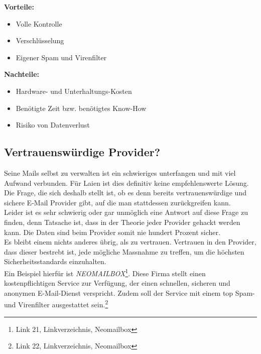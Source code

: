 \textbf{Vorteile:}
\begin{itemize}
    \item Volle Kontrolle
    \item Verschlüsselung
    \item Eigener Spam und Virenfilter
\end{itemize}

\textbf{Nachteile:}
\begin{itemize}
    \item Hardware- und Unterhaltungs-Kosten
    \item Benötigte Zeit bzw. benötigtes Know-How
    \item Risiko von Datenverlust
\end{itemize}

\subsection{Vertrauenswürdige Provider?}
Seine Mails selbst zu verwalten ist ein schwieriges unterfangen und mit viel Aufwand verbunden. Für Laien ist dies definitiv keine empfehlenswerte Lösung. Die Frage, die sich deshalb stellt ist, ob es denn bereits vertrauenswürdige und sichere E-Mail Provider gibt, auf die man stattdessen zurückgreifen kann. \\
Leider ist es sehr schwierig oder gar unmöglich eine Antwort auf diese Frage zu finden, denn Tatsache ist, dass in der Theorie jeder Provider gehackt werden kann. Die Daten sind beim Provider somit nie hundert Prozent sicher. \\
Es bleibt einem nichts anderes übrig, als zu vertrauen. Vertrauen in den Provider, dass dieser bestrebt ist, jede mögliche Massnahme zu treffen, um die höchsten Sicherheitsstandards einzuhalten. \\
Ein Beispiel hierfür ist \textit{NEOMAILBOX}\footnote{Link 21, Linkverzeichnis, Neomailbox}. Diese Firma stellt einen kostenpflichtigen Service zur Verfügung, der einen schnellen, sicheren und anonymen E-Mail-Dienst verspricht. Zudem soll der Service mit einem top Spam- und Virenfilter ausgestattet sein.\footnote{Link 22, Linkverzeichnis, Neomailbox}
